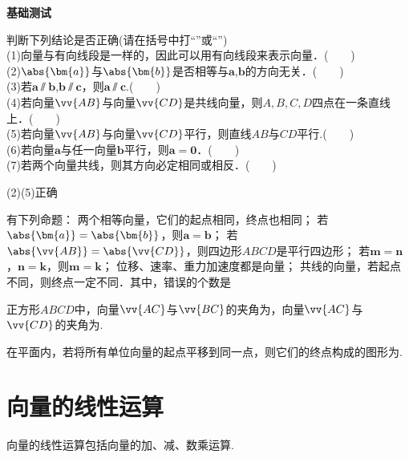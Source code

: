   \begin{exercise}{\textbf{基础测试}}
    \item
      判断下列结论是否正确(请在括号中打“\checkmark”或“\XSolidBrush”)\\
      (1)向量与有向线段是一样的，因此可以用有向线段来表示向量．(　　)\\
      (2)$\abs{\bm{a}}$与$\abs{\bm{b}}$是否相等与$\bm{a}$,$\bm{b}$的方向无关．(　　)\\
      (3)若$\bm{a}\varparallel\bm{b}$,$\bm{b}\varparallel\bm{c}$，则$\bm{a}\varparallel\bm{c}$.(　　)\\
      (4)若向量$\vv{AB}$与向量$\vv{CD}$是共线向量，则$A,B,C,D$四点在一条直线上．(　　)\\
      (5)若向量$\vv{AB}$与向量$\vv{CD}$平行，则直线$AB$与$CD$平行.(　　)\\
      (6)若向量$\bm a$与任一向量$\bm b$平行，则$\bm a=\bm 0$．(　　)\\
      (7)若两个向量共线，则其方向必定相同或相反．(　　)
      \begin{answer}
        (2)(5)正确
      \end{answer}
    \item
      有下列命题：
      两个相等向量，它们的起点相同，终点也相同；
      若$\abs{\bm{a}}=\abs{\bm{b}}$，则$\bm{a}=\bm{b}$；
      若$\abs{\vv{AB}}=\abs{\vv{CD}}$，则四边形$ABCD$是平行四边形；
      若$\bm{m}=\bm{n}$，$\bm{n}=\bm{k}$，则$\bm{m}=\bm{k}$；
      位移、速率、重力加速度都是向量；
      共线的向量，若起点不同，则终点一定不同．其中，错误的个数是\xz
    \item
      正方形$ABCD$中，向量$\vv{AC}$与$\vv{BC}$的夹角为\tk，向量$\vv{AC}$与$\vv{CD}$的夹角为\tk.
    \item
      在平面内，若将所有单位向量的起点平移到同一点，则它们的终点构成的图形为\tk.
  \end{exercise}
\newpage
\section{向量的线性运算}
  向量的线性运算包括向量的加、减、数乘运算.
